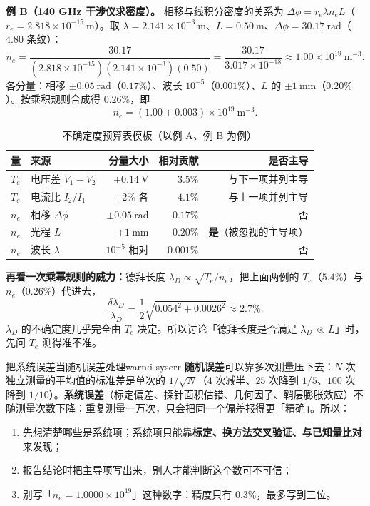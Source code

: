 \textbf{例 B（140 GHz 干涉仪求密度）。} 相移与线积分密度的关系为 $\Delta\phi=r_e\lambda n_eL$（$r_e=2.818\times10^{-15}\ \mathrm{m}$）。取 $\lambda=2.141\times10^{-3}\ \mathrm{m}$、$L=0.50\ \mathrm{m}$、$\Delta\phi=30.17\ \mathrm{rad}$（$4.80$ 条纹）：
\begin{equation}
n_e=\frac{30.17}{(2.818\times10^{-15})(2.141\times10^{-3})(0.50)}
=\frac{30.17}{3.017\times10^{-18}}\approx1.00\times10^{19}\ \mathrm{m^{-3}}.
\end{equation}
各分量：相移 $\pm0.05\ \mathrm{rad}$（$0.17\%$）、波长 $10^{-5}$（$0.001\%$）、$L$ 的 $\pm1\ \mathrm{mm}$（$0.20\%$）。按乘积规则合成得 $0.26\%$，即
\begin{equation}
n_e=(1.00\pm0.003)\times10^{19}\ \mathrm{m^{-3}}.
\end{equation}

\begin{table}[htbp]
\centering
\small
\caption{不确定度预算表模板（以例 A、例 B 为例）}
\label{tab:app-i-budget}
\begin{tabular}{@{}llrrr@{}}
\toprule
量 & 来源 & 分量大小 & 相对贡献 & 是否主导 \\
\midrule
$T_e$ & 电压差 $V_1-V_2$ & $\pm0.14\ \mathrm{V}$ & $3.5\%$ & 与下一项并列主导 \\
$T_e$ & 电流比 $I_2/I_1$ & $\pm2\%$ 各 & $4.1\%$ & 与上一项并列主导 \\
$n_e$ & 相移 $\Delta\phi$ & $\pm0.05\ \mathrm{rad}$ & $0.17\%$ & 否 \\
$n_e$ & 光程 $L$ & $\pm1\ \mathrm{mm}$ & $0.20\%$ & \textbf{是}（被忽视的主导项） \\
$n_e$ & 波长 $\lambda$ & $10^{-5}$ 相对 & $0.001\%$ & 否 \\
\bottomrule
\end{tabular}
\end{table}

\textbf{再看一次乘幂规则的威力：}德拜长度 $\lambda_D\propto\sqrt{T_e/n_e}$，把上面两例的 $T_e$（$5.4\%$）与 $n_e$（$0.26\%$）代进去，
\begin{equation}
\frac{\delta\lambda_D}{\lambda_D}=\frac12\sqrt{0.054^2+0.0026^2}\approx2.7\% .
\end{equation}
$\lambda_D$ 的不确定度几乎完全由 $T_e$ 决定。所以讨论「德拜长度是否满足 $\lambda_D\ll L$」时，先问 $T_e$ 测得准不准。

\begin{warning}{把系统误差当随机误差处理}{warn:i-syserr}
\textbf{随机误差}可以靠多次测量压下去：$N$ 次独立测量的平均值的标准差是单次的 $1/\sqrt{N}$（$4$ 次减半、$25$ 次降到 $1/5$、$100$ 次降到 $1/10$）。\textbf{系统误差}（标定偏差、探针面积估错、几何因子、鞘层膨胀效应）不随测量次数下降：重复测量一万次，只会把同一个偏差报得更「精确」。所以：
\begin{enumerate}[nosep,leftmargin=1.6em]
  \item 先想清楚哪些是系统项；系统项只能靠\textbf{标定、换方法交叉验证、与已知量比对}来发现；
  \item 报告结论时把主导项写出来，别人才能判断这个数可不可信；
  \item 别写「$n_e=1.0000\times10^{19}$」这种数字：精度只有 $0.3\%$，最多写到三位。
\end{enumerate}
\end{warning}


